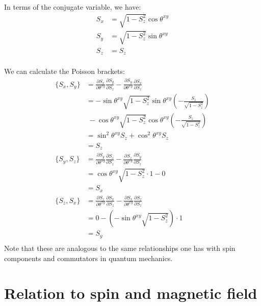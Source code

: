 \documentclass[aps,pra,10pt,floatfix,nofootinbib]{revtex4-1}
\theoremstyle{definition}
\begin{document}
In terms of the conjugate variable, we have:
\begin{equation}
\begin{aligned}
S_x &= \sqrt{1-S_z^2} \cos \theta^{xy} \\
S_y &= \sqrt{1-S_z^2} \sin \theta^{xy} \\
S_z &= S_z\\
\end{aligned}
\label{SpinComponents}
\end{equation}

We can calculate the Poisson brackets:
\begin{equation}
\begin{aligned}
\{S_x, S_y\} &= \frac{\partial S_x}{\partial \theta^{xy}}\frac{\partial S_y}{\partial S_z} - \frac{\partial S_y}{\partial \theta^{xy}}\frac{\partial S_x}{\partial S_z} \\
&= -\sin \theta^{xy} \sqrt{1-S_z^2} \sin \theta^{xy} (- \frac{S_z}{\sqrt{1-S_z^2}})  \\ 
&\; - \cos \theta^{xy} \sqrt{1-S_z^2} \cos \theta^{xy} (- \frac{S_z}{\sqrt{1-S_z^2}}) \\
&= \sin^2 \theta^{xy} S_z +\cos^2 \theta^{xy} S_z \\
&= S_z \\
\{S_y, S_z\} &= \frac{\partial S_y}{\partial \theta^{xy}}\frac{\partial S_z}{\partial S_z} - \frac{\partial S_z}{\partial \theta^{xy}}\frac{\partial S_y}{\partial S_z} \\
&= \cos \theta^{xy} \sqrt{1-S_z^2} \cdot 1 - 0 \\
&= S_x \\
\{S_z, S_x\} &= \frac{\partial S_z}{\partial \theta^{xy}}\frac{\partial S_x}{\partial S_z} - \frac{\partial S_x}{\partial \theta^{xy}}\frac{\partial S_z}{\partial S_z} \\
&= 0 - (-\sin \theta^{xy} \sqrt{1-S_z^2}) \cdot 1 \\
&= S_y \\
\end{aligned}
\label{SpinBrackets}
\end{equation}
Note that these are analogous to the same relationships one has with spin components and commutators in quantum mechanics.

\section{Relation to spin and magnetic field}
\end{document}
